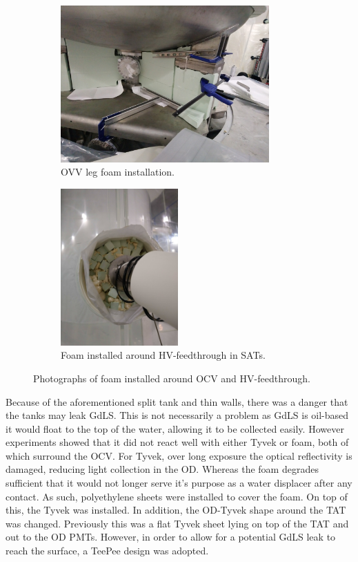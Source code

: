 \begin{figure}[!tbph]
\begin{subfigure}{.5\textwidth}
  \centering
  \includegraphics[height=6cm, width=\linewidth]{Figures/Construction/BAT_green_foam.JPG}
  \caption{OVV leg foam installation.}
  \label{fig:ocv_leg_foam}
  \end{subfigure}
  \begin{subfigure}{.5\textwidth}
  \centering
  \includegraphics[height=6cm, width=\linewidth]{Figures/Construction/HV_foam.jpg}
  \caption{Foam installed around HV-feedthrough in SATs.}
  \label{fig:hv_port_foam}
  \end{subfigure}
\caption{Photographs of foam installed around OCV and HV-feedthrough.}
\label{fig:Additional_foam_installation}
\end{figure}

\par
Because of the aforementioned split tank and thin walls, there was a danger that the tanks may leak GdLS.
This is not necessarily a problem as GdLS is oil-based it would float to the top of the water, allowing it to be collected easily.
However experiments showed that it did not react well with either Tyvek or foam, both of which surround the OCV.
For Tyvek, over long exposure the optical reflectivity is damaged, reducing light collection in the OD.
Whereas the foam degrades sufficient that it would not longer serve it's purpose as a water displacer after any contact.
As such, polyethylene sheets were installed to cover the foam.
On top of this, the Tyvek was installed.
In addition, the OD-Tyvek shape around the TAT was changed.
Previously this was a flat Tyvek sheet lying on top of the TAT and out to the OD PMTs.
However, in order to allow for a potential GdLS leak to reach the surface, a TeePee design was adopted.


